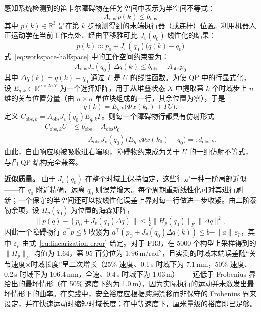 感知系统检测到的笛卡尔障碍物在任务空间中表示为半空间不等式：
\begin{equation}
\label{eq:workspace-halfspace}
A_{\text{obs}} \, p(k) \leq b_{\text{obs}}
\end{equation}
其中 \(p(k) \in \mathbb{R}^3\) 是在第 \(k\) 步预测得到的末端执行器（或连杆）位置。利用机器人正运动学在当前工作点处、经由平移雅可比 \(J_v(q_0)\) 线性化的结果：
\begin{equation}
\label{eq:fk-linearization}
p(k) \approx p_0 + J_v(q_0)\bigl(q(k) - q_0\bigr)
\end{equation}
式~\eqref{eq:workspace-halfspace} 中的工作空间约束变为：
\begin{equation}
\label{eq:workspace-linear-row}
A_{\text{obs}} J_v(q_0) \, \Delta q(k)
\leq b_{\text{obs}} - A_{\text{obs}} p_0
\end{equation}
其中 \(\Delta q(k) = q(k) - q_0\) 通过 \(\Gamma\) 是 \(U\) 的线性函数。为使 QP 中的行显式化，设 \(E_{q,k}\in\mathbb{R}^{n\times 2nN}\) 为一个选择矩阵，用于从堆叠状态 \(X\) 中提取第 \(k\) 个时域步上 \(n\) 维的关节位置分量（由 \(n\times n\) 单位块组成的一行，其余位置为零），于是
\begin{equation}
\label{eq:position-selector}
q(k)=E_{q,k}\bigl(\Phi x(k_0)+\Gamma U\bigr).
\end{equation}
定义 \(C_{\text{obs},k}=A_{\text{obs}}J_v(q_0)E_{q,k}\Gamma\)。则每一个障碍物行都具有仿射形式
\begin{equation}
\label{eq:obstacle-row}
\begin{aligned}
 C_{\text{obs},k}U
&\le b_{\text{obs}}-A_{\text{obs}}p_0 \\
&\quad
-A_{\text{obs}}J_v(q_0)\bigl(E_{q,k}\Phi x(k_0)-q_0\bigr)
=: d_{\text{obs},k}.
\end{aligned}
\end{equation}
由此，自由响应项被吸收进右端项，障碍物约束成为关于 \(U\) 的一组仿射不等式，与凸 QP 结构完全兼容。

\textbf{近似质量。} 由于 \(J_v(q_0)\) 在整个时域上保持恒定，这些行是一种一阶局部近似——在 \(q_0\) 附近精确，远离 \(q_0\) 则误差增大。每个周期重新线性化可对其进行刷新；一个保守的半空间还可以按线性化误差上界对每一行做进一步收紧。由二阶泰勒余项，设 \(H_p(q_0)\) 为位置的海森矩阵，
\begin{equation}
\label{eq:linearization-error}
\|p(q) - (p_0 + J_v(q_0)\Delta q)\|
\leq \tfrac{1}{2} \|H_p(q_0)\|_F \|\Delta q\|^2,
\end{equation}
因此一个障碍物行 \(a^\top p\le b\) 收紧为
\(a^\top(p_0+J_v(q_0)\Delta q(k))\le b-\|a\|\,\varepsilon_p\)，其中 \(\varepsilon_p\) 由式~\eqref{eq:linearization-error} 给定。对于 FR3，在 5000 个构型上采样得到的 \(\|H_p\|_F\) 均值为 \(1.64\)，第 95 百分位为 \(1.96\)\,m/rad\(^2\)，且实测的时域末端误差随“关节速度\(\times\)时域长度”呈二次增长（25\% 速度、0.1\,s 时域下为 7.1\,mm，50\% 速度、0.2\,s 时域下为 106.4\,mm，全速、0.4\,s 时域下为 1.03\,m）——远低于 Frobenius 界给出的最坏情形（在 50\% 速度下约为 1.0\,m），因为实际执行的运动并未激发出最坏情形下的曲率。在实践中，安全裕度应根据\emph{实测}漂移而非保守的 Frobenius 界来设定，并在快速运动时缩短时域长度；在中等速度下，厘米量级的裕度即已足够。

